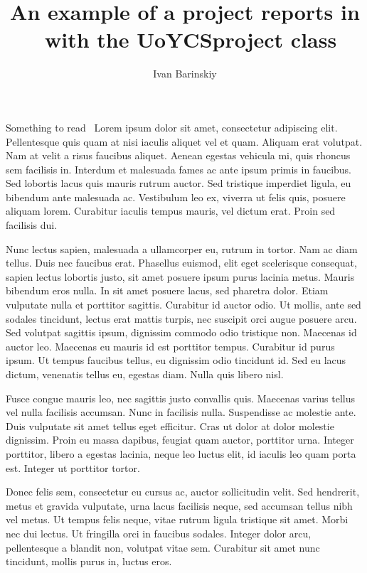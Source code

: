 \documentclass{./styles/UoYCSproject}
\author{Ivan Barinskiy}
\title{An example of a project reports in \LaTeXe\ with the   \textsf{UoYCSproject} class}
\begin{document}
\maketitle
\listoffigures
\listoftables

\begin{summary}
Something to read~\cite{zobel2015writing} Lorem ipsum dolor sit amet, consectetur adipiscing elit. Pellentesque quis quam at nisi iaculis aliquet vel et quam. Aliquam erat volutpat. Nam at velit a risus faucibus aliquet. Aenean egestas vehicula mi, quis rhoncus sem facilisis in. Interdum et malesuada fames ac ante ipsum primis in faucibus. Sed lobortis lacus quis mauris rutrum auctor. Sed tristique imperdiet ligula, eu bibendum ante malesuada ac. Vestibulum leo ex, viverra ut felis quis, posuere aliquam lorem. Curabitur iaculis tempus mauris, vel dictum erat. Proin sed facilisis dui.

Nunc lectus sapien, malesuada a ullamcorper eu, rutrum in tortor. Nam ac diam tellus. Duis nec faucibus erat. Phasellus euismod, elit eget scelerisque consequat, sapien lectus lobortis justo, sit amet posuere ipsum purus lacinia metus. Mauris bibendum eros nulla. In sit amet posuere lacus, sed pharetra dolor. Etiam vulputate nulla et porttitor sagittis. Curabitur id auctor odio. Ut mollis, ante sed sodales tincidunt, lectus erat mattis turpis, nec suscipit orci augue posuere arcu. Sed volutpat sagittis ipsum, dignissim commodo odio tristique non. Maecenas id auctor leo. Maecenas eu mauris id est porttitor tempus. Curabitur id purus ipsum. Ut tempus faucibus tellus, eu dignissim odio tincidunt id. Sed eu lacus dictum, venenatis tellus eu, egestas diam. Nulla quis libero nisl.

Fusce congue mauris leo, nec sagittis justo convallis quis. Maecenas varius tellus vel nulla facilisis accumsan. Nunc in facilisis nulla. Suspendisse ac molestie ante. Duis vulputate sit amet tellus eget efficitur. Cras ut dolor at dolor molestie dignissim. Proin eu massa dapibus, feugiat quam auctor, porttitor urna. Integer porttitor, libero a egestas lacinia, neque leo luctus elit, id iaculis leo quam porta est. Integer ut porttitor tortor.

Donec felis sem, consectetur eu cursus ac, auctor sollicitudin velit. Sed hendrerit, metus et gravida vulputate, urna lacus facilisis neque, sed accumsan tellus nibh vel metus. Ut tempus felis neque, vitae rutrum ligula tristique sit amet. Morbi nec dui lectus. Ut fringilla orci in faucibus sodales. Integer dolor arcu, pellentesque a blandit non, volutpat vitae sem. Curabitur sit amet nunc tincidunt, mollis purus in, luctus eros.


\end{summary}
\end{document}
